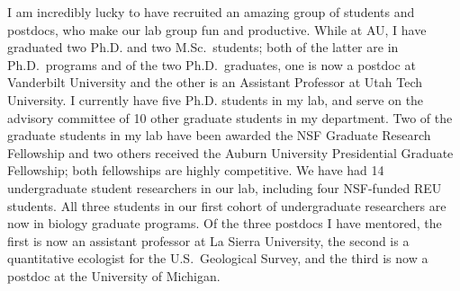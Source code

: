 I am incredibly lucky to have recruited an amazing group of students and
postdocs, who make
our lab group fun and productive.
While at AU, I have graduated two Ph.D. and two M.Sc.\ students;
both of the latter are in Ph.D.\ programs and of the two Ph.D.\
graduates, one is now a postdoc at Vanderbilt University and the
other is an Assistant Professor at Utah Tech University.
I currently have five Ph.D. students in my lab, and serve on the advisory
committee of 10 other graduate students in my department.
Two of the graduate students in my lab have been
awarded the NSF Graduate Research Fellowship and two others received the
Auburn University Presidential Graduate Fellowship;
both fellowships are highly competitive.
We have had 14 undergraduate student researchers in our lab, including four
NSF-funded REU students.
All three students in our first cohort of undergraduate researchers are now in
biology graduate programs.
Of the three postdocs I have mentored,
the first is now an assistant professor at La Sierra University, the second is
a quantitative ecologist for the U.S.\ Geological Survey, and the third is
now a postdoc at the University of Michigan.

